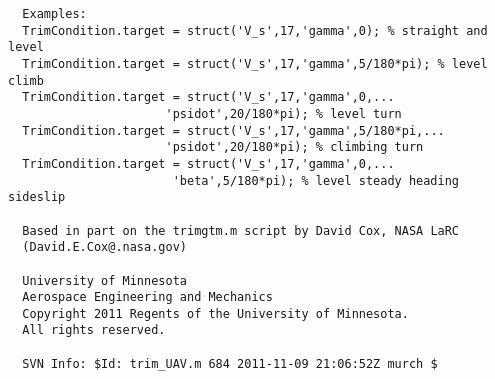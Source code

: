 \documentclass[12pt]{article}
\begin{document}
\begin{verbatim}
  Examples:
  TrimCondition.target = struct('V_s',17,'gamma',0); % straight and level
  TrimCondition.target = struct('V_s',17,'gamma',5/180*pi); % level climb
  TrimCondition.target = struct('V_s',17,'gamma',0,...
                      'psidot',20/180*pi); % level turn
  TrimCondition.target = struct('V_s',17,'gamma',5/180*pi,...
                      'psidot',20/180*pi); % climbing turn
  TrimCondition.target = struct('V_s',17,'gamma',0,...
                       'beta',5/180*pi); % level steady heading sideslip
 
  Based in part on the trimgtm.m script by David Cox, NASA LaRC 
  (David.E.Cox@.nasa.gov)
 
  University of Minnesota 
  Aerospace Engineering and Mechanics 
  Copyright 2011 Regents of the University of Minnesota. 
  All rights reserved.
 
  SVN Info: $Id: trim_UAV.m 684 2011-11-09 21:06:52Z murch $


\end{verbatim}
\end{document}
